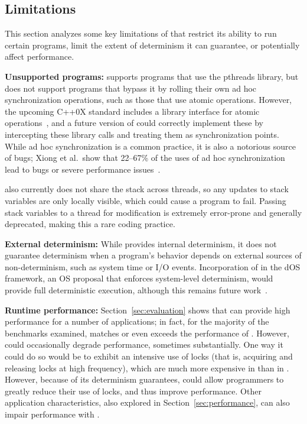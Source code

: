 \subsection{Limitations}
\label{sec:limitations}

This section analyzes some key limitations of \dthreads{} that restrict its ability to run certain programs, limit the extent of determinism it can guarantee, or potentially affect performance.

\textbf{Unsupported programs: }
\dthreads{} supports programs that
use the pthreads library, but does not support programs that
bypass it by rolling their own ad hoc synchronization operations, such as those that use atomic operations. However, the upcoming C++0X standard includes a library interface for atomic operations~\cite[pp. 1107--1128]{c++0xstandarddraft}, and a future version of \dthreads{} could correctly implement these by intercepting these library calls and treating them as synchronization points. While ad hoc synchronization is a common practice, it is also a notorious source of bugs; Xiong et al.\ show that 22--67\% of the uses of ad hoc
synchronization lead to bugs or severe performance issues~\cite{ad-hoc-considered-harmful}.

\dthreads{} also currently does not share the stack
across threads, so any updates to stack variables are only locally visible, which could cause a program to fail. Passing stack variables to a thread for modification is extremely error-prone and generally deprecated, making this a rare
coding practice.

\textbf{External determinism: }
While \dthreads{} provides internal determinism, it does not guarantee determinism when a program's behavior depends on external sources of non-determinism, such as system time or I/O events. Incorporation of \dthreads{} in the dOS framework, an OS proposal that enforces system-level determinism, would provide full deterministic execution, although this remains future work~\cite{deterministic-process-groups}.

\textbf{Runtime performance: }
Section~\ref{sec:evaluation} shows that \dthreads{} can provide high performance for a number of applications; in fact, for the majority of the benchmarks examined, \dthreads{} matches or even exceeds the performance of \pthreads{}. However, \dthreads{} could occasionally degrade performance, sometimes substantially. One way it could do so would be to exhibit an intensive use of locks (that is, acquiring and releasing locks at high frequency), which are much more expensive
in \dthreads{} than in \pthreads{}. However, because of its determinism guarantees, \dthreads{} could allow programmers to greatly reduce their use of locks, and thus improve performance. Other application characteristics, also explored in Section~\ref{sec:performance}, can also impair performance
with \dthreads{}.



